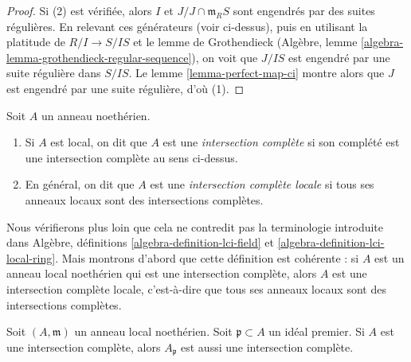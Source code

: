 \begin{proof}
\medskip\noindent
Si (2) est vérifiée, alors $I$ et $J/J \cap\mathfrak m_RS$
sont engendrés par des suites régulières. En relevant ces générateurs (voir
ci-dessus), puis en utilisant la platitude de $R/I \to S/IS$ et
le lemme de Grothendieck
(Algèbre, lemme \ref{algebra-lemma-grothendieck-regular-sequence}),
on voit que $J/IS$ est engendré par une suite régulière dans $S/IS$.
Le lemme \ref{lemma-perfect-map-ci} montre alors que $J$
est engendré par une suite régulière, d'où (1).
\end{proof}

\begin{definition}
\label{definition-lci}
Soit $A$ un anneau noethérien.
\begin{enumerate}
\item Si $A$ est local, on dit que $A$ est une {\it intersection complète}
si son complété est une intersection complète au sens ci-dessus.
\item En général, on dit que $A$ est une {\it intersection complète locale}
si tous ses anneaux locaux sont des intersections complètes.
\end{enumerate}
\end{definition}

\noindent
Nous vérifierons plus loin que cela ne contredit pas la terminologie
introduite dans
Algèbre, définitions \ref{algebra-definition-lci-field} et
\ref{algebra-definition-lci-local-ring}.
Mais montrons d'abord que cette définition est
cohérente : si $A$ est un anneau local
noethérien qui est une intersection complète, alors $A$ est une intersection complète locale,
c'est-à-dire que tous ses anneaux locaux sont des intersections complètes.

\begin{lemma}
\label{lemma-ci-good}
Soit $(A, \mathfrak m)$ un anneau local noethérien. Soit
$\mathfrak p \subset A$ un idéal premier. Si $A$ est une
intersection complète, alors $A_\mathfrak p$ est aussi une intersection complète.
\end{lemma}

